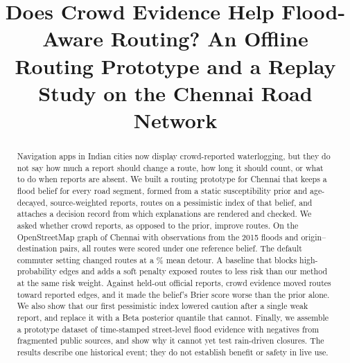 \documentclass[conference]{IEEEtran}
\begin{document}

\title{Does Crowd Evidence Help Flood-Aware Routing? An Offline Routing Prototype and a Replay Study on the Chennai Road Network}

\author{
\and
{}
\and
{}
}

\maketitle

\begin{abstract}
Navigation apps in Indian cities now display crowd-reported waterlogging, but they do not say how much a report should change a route, how long it should count, or what to do when reports are absent. We built a routing prototype for Chennai that keeps a flood belief for every road segment, formed from a static susceptibility prior and age-decayed, source-weighted reports, routes on a pessimistic index of that belief, and attaches a decision record from which explanations are rendered and checked. We asked whether crowd reports, as opposed to the prior, improve routes. On the OpenStreetMap graph of Chennai with \NObs{} observations from the 2015 floods and \NOD{} origin--destination pairs, all routes were scored under one reference belief. The default commuter setting changed \ChgThree{} routes at a \DetThree\% mean detour. A baseline that blocks high-probability edges and adds a soft penalty exposed routes to less risk than our method at the same risk weight. Against held-out official reports, crowd evidence moved routes toward reported edges, and it made the belief's Brier score worse than the prior alone. We also show that our first pessimistic index lowered caution after a single weak report, and replace it with a Beta posterior quantile that cannot. Finally, we assemble a prototype dataset of time-stamped street-level flood evidence with negatives from fragmented public sources, and show why it cannot yet test rain-driven closures. The results describe one historical event; they do not establish benefit or safety in live use.
\end{abstract}
\end{document}
